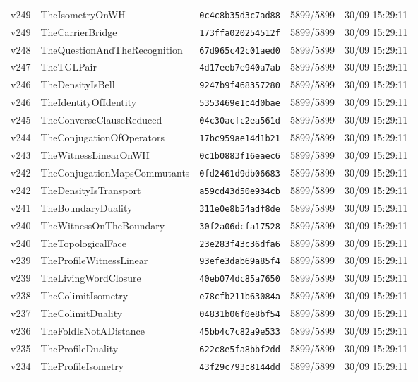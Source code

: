 \documentclass[11pt]{article}
\theoremstyle{definition}\newtheorem{deriv}{Derivation}
\begin{document}
{\begin{longtable}{@{}lllll@{}}
v249 & TheIsometryOnWH & \texttt{0c4c8b35d3c7ad88} & 5899/5899 & 30/09 15:29:11 \\
v249 & TheCarrierBridge & \texttt{173ffa020254512f} & 5899/5899 & 30/09 15:29:11 \\
v248 & TheQuestionAndTheRecognition & \texttt{67d965c42c01aed0} & 5899/5899 & 30/09 15:29:11 \\
v247 & TheTGLPair & \texttt{4d17eeb7e940a7ab} & 5899/5899 & 30/09 15:29:11 \\
v246 & TheDensityIsBell & \texttt{9247b9f468357280} & 5899/5899 & 30/09 15:29:11 \\
v246 & TheIdentityOfIdentity & \texttt{5353469e1c4d0bae} & 5899/5899 & 30/09 15:29:11 \\
v245 & TheConverseClauseReduced & \texttt{04c30acfc2ea561d} & 5899/5899 & 30/09 15:29:11 \\
v244 & TheConjugationOfOperators & \texttt{17bc959ae14d1b21} & 5899/5899 & 30/09 15:29:11 \\
v243 & TheWitnessLinearOnWH & \texttt{0c1b0883f16eaec6} & 5899/5899 & 30/09 15:29:11 \\
v242 & TheConjugationMapsCommutants & \texttt{0fd2461d9db06683} & 5899/5899 & 30/09 15:29:11 \\
v242 & TheDensityIsTransport & \texttt{a59cd43d50e934cb} & 5899/5899 & 30/09 15:29:11 \\
v241 & TheBoundaryDuality & \texttt{311e0e8b54adf8de} & 5899/5899 & 30/09 15:29:11 \\
v240 & TheWitnessOnTheBoundary & \texttt{30f2a06dcfa17528} & 5899/5899 & 30/09 15:29:11 \\
v240 & TheTopologicalFace & \texttt{23e283f43c36dfa6} & 5899/5899 & 30/09 15:29:11 \\
v239 & TheProfileWitnessLinear & \texttt{93efe3dab69a85f4} & 5899/5899 & 30/09 15:29:11 \\
v239 & TheLivingWordClosure & \texttt{40eb074dc85a7650} & 5899/5899 & 30/09 15:29:11 \\
v238 & TheColimitIsometry & \texttt{e78cfb211b63084a} & 5899/5899 & 30/09 15:29:11 \\
v237 & TheColimitDuality & \texttt{04831b06f0e8bf54} & 5899/5899 & 30/09 15:29:11 \\
v236 & TheFoldIsNotADistance & \texttt{45bb4c7c82a9e533} & 5899/5899 & 30/09 15:29:11 \\
v235 & TheProfileDuality & \texttt{622c8e5fa8bbf2dd} & 5899/5899 & 30/09 15:29:11 \\
v234 & TheProfileIsometry & \texttt{43f29c793c8144dd} & 5899/5899 & 30/09 15:29:11 \\

\end{longtable}}
\end{document}
